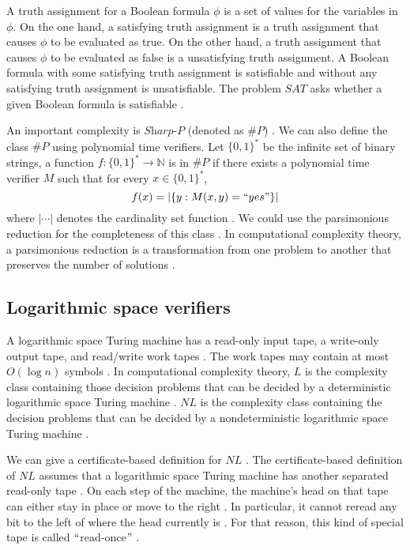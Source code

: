 \documentclass[a4paper,UKenglish,cleveref, autoref]{lipics-v2019}
\begin{document}
A truth assignment for a Boolean formula $\phi$ is a set of values for the variables in $\phi$. On the one hand, a satisfying truth assignment is a truth assignment that causes $\phi$ to be evaluated as true. On the other hand, a truth assignment that causes $\phi$ to be evaluated as false is a unsatisfying truth assignment. A Boolean formula with some satisfying truth assignment is satisfiable and without any satisfying truth assignment is unsatisfiable. The problem $SAT$ asks whether a given Boolean formula is satisfiable \cite{GJ79}.

An important complexity is $\textit{Sharp-P}$ (denoted as $\#P$) \cite{LV79}. We can also define the class $\#P$ using polynomial time verifiers. Let $\{0, 1\}^{*}$ be the infinite set of binary strings, a function $f : \{0, 1\}^{*} \rightarrow \mathbb{N}$ is in $\#P$ if there exists a polynomial time verifier $M$ such that for every $x \in \{0, 1\}^{*}$,
\[f(x) = |\{y : M(x, y) = ``yes"\}|\]
where $|\cdots|$ denotes the cardinality set function \cite{AB09}. We could use the parsimonious reduction for the completeness of this class \cite{AB09}. In computational complexity theory, a parsimonious reduction is a transformation from one problem to another that preserves the number of solutions \cite{AB09}.

\subsection{Logarithmic space verifiers}

A logarithmic space Turing machine has a read-only input tape, a write-only output tape, and read/write work tapes \cite{MS06}. The work tapes may contain at most $O(\log n)$ symbols \cite{MS06}. In computational complexity theory, $L$ is the complexity class containing those decision problems that can be decided by a deterministic logarithmic space Turing machine \cite{Pap03}. $NL$ is the complexity class containing the decision problems that can be decided by a nondeterministic logarithmic space Turing machine \cite{Pap03}.

We can give a certificate-based definition for $NL$ \cite{AB09}. The certificate-based definition of $NL$ assumes that a logarithmic space Turing machine has another separated read-only tape \cite{AB09}. On each step of the machine, the machine's head on that tape can either stay in place or move to the right \cite{AB09}. In particular, it cannot reread any bit to the left of where the head currently is \cite{AB09}. For that reason, this kind of special tape is called $``$read-once$"$ \cite{AB09}.
\end{document}
